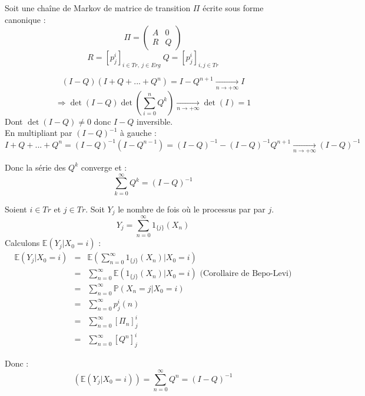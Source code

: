 Soit une chaîne de Markov de matrice de transition $\Pi$ écrite sous forme canonique :
\[\Pi=\begin{pmatrix} A & 0 \\ R & Q \end{pmatrix}\]
\[R=[p^i_j]_{i\in Tr,\ j\in Erg}\ Q=[p^i_j]_{i,j\in Tr}\]

\begin{dem}
\[(I-Q)(I+Q+...+Q^n)=I-Q^{n+1}\xrightarrow[n\to+\infty]{}I\]
\[\Rightarrow \det(I-Q)\det\left( \sum_{i=0}^n Q^k\right)\xrightarrow[n\to+\infty]{}\det(I)=1\]
Dont $\det(I-Q)\neq 0$ donc $I-Q$ inversible. \\
En multipliant par $(I-Q)^{-1}$ à gauche :
\[I+Q+...+Q^n=(I-Q)^{-1}(I-Q^{n-1})=(I-Q)^{-1}-(I-Q)^{-1}Q^{n+1}\xrightarrow[n\to+\infty]{}(I-Q)^{-1}\]

Donc la série des $Q^k$ converge et :
\[\sum_{k=0}^\infty Q^k=(I-Q)^{-1}\]
\end{dem}


\begin{dem}
Soient $i\in Tr$ et $j\in Tr$. Soit $Y_j$ le nombre de fois où le processus par par $j$.
	\[Y_j=\sum_{n=0}^\infty 1_{\{j\}}(X_n)\]
Calculons $\mathbb{E}(Y_j|X_0=i)$ : 
\begin{eqnarray*}
\mathbb{E}(Y_j|X_0=i)&=&\mathbb{E}\left( \sum_{n=0}^\infty 1_{\{j\}}(X_n)|X_0=i\right)\\
		&=& \sum_{n=0}^\infty \mathbb{E}(1_{\{j\}}(X_n)|X_0=i) \text{ (Corollaire de Bepo-Levi)}\\
		&=& \sum_{n=0}^\infty \mathbb{P}(X_n=j|X_0=i) \\
		&=& \sum_{n=0}^\infty p^i_j(n) \\
		&=& \sum_{n=0}^\infty [\Pi_n]_j^i\\
		&=& \sum_{n=0}^\infty [Q^n]_j^i
\end{eqnarray*}

Donc :
\[\left(\mathbb{E}(Y_j|X_0=i)\right)=\sum_{n=0}^\infty Q^n = (I-Q)^{-1}\]
\end{dem}



